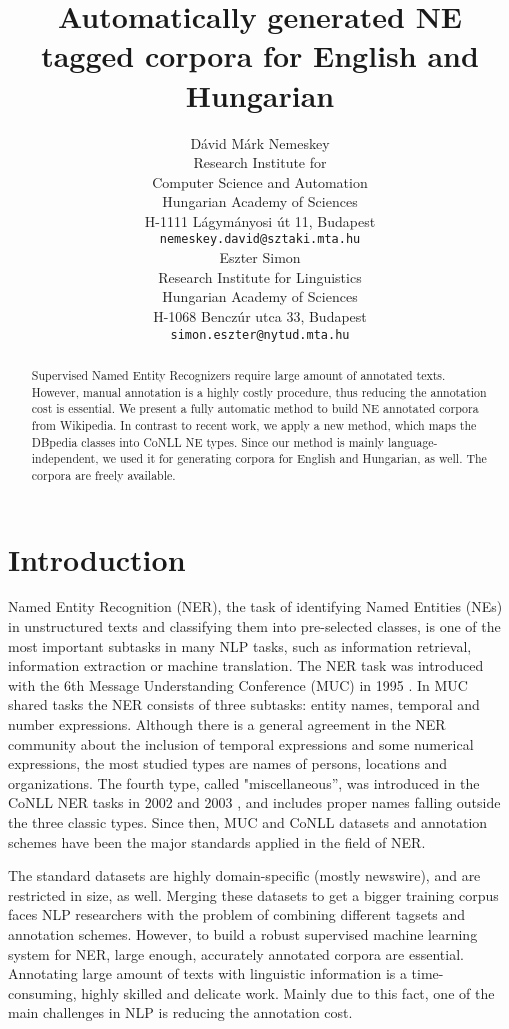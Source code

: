\documentclass[11pt]{article}
\title{Automatically generated NE tagged corpora for English and Hungarian}
\author{Dávid Márk Nemeskey \\
  Research Institute for \\ Computer Science and Automation \\
  Hungarian Academy of Sciences \\
  H-1111 Lágymányosi út 11, Budapest \\
  {\tt nemeskey.david@sztaki.mta.hu} \\\And
  Eszter Simon \\
  Research Institute for Linguistics \\
  Hungarian Academy of Sciences \\
  H-1068 Benczúr utca 33, Budapest \\
  {\tt simon.eszter@nytud.mta.hu} \\}
\date{}
\begin{document}
\maketitle
\begin{abstract}

Supervised Named Entity Recognizers require large amount of annotated texts. However, manual annotation is a highly costly procedure, thus reducing the annotation cost is essential. We present a fully automatic method to build NE annotated corpora from Wikipedia. In contrast to recent work, we apply a new method, which maps the DBpedia classes into CoNLL NE types. Since our method is mainly language-independent, we used it for generating corpora for English and Hungarian, as well. The corpora are freely available. 

\end{abstract}

\section{Introduction}
\label{sec:intro}

Named Entity Recognition (NER), the task of identifying Named Entities (NEs) in unstructured texts and classifying them into pre-selected classes, is one of the most important subtasks in many NLP tasks, such as information retrieval, information extraction or machine translation. The NER task was introduced with the 6th Message Understanding Conference (MUC) in 1995 \cite{Grishman:96}. In MUC shared tasks the NER consists of three subtasks: entity names, temporal and number expressions. Although there is a general agreement in the NER community about the inclusion of temporal expressions and some numerical expressions, the most studied types are names of persons, locations and organizations. The fourth type, called "miscellaneous'', was introduced in the CoNLL NER tasks in 2002 \cite{Tjong:02} and 2003 \cite{Tjong:03}, and includes proper names falling outside the three classic types. Since then, MUC and CoNLL datasets and annotation schemes have been the major standards applied in the field of NER. 

The standard datasets are highly domain-specific (mostly newswire), and are restricted in size, as well. 
Merging these datasets to get a bigger training corpus faces NLP researchers with the problem of combining different tagsets and annotation schemes. However, to build a robust supervised machine learning system for NER, large enough, accurately annotated corpora are essential. Annotating large amount of texts with linguistic information is a time-consuming, highly skilled and delicate work. Mainly due to this fact, one of the main challenges in NLP is reducing the annotation cost. 
\end{document}
